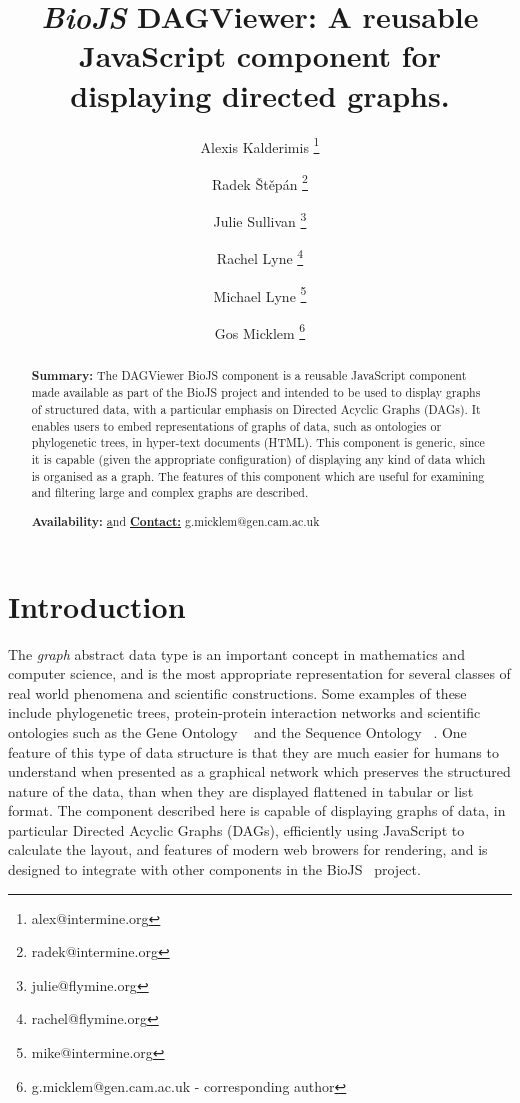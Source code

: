 \documentclass[10pt,a4paper,twocolumn]{article}
\begin{document}
\title{\textit{BioJS} DAGViewer:
  A reusable JavaScript component for displaying directed graphs.
}

\author[1]{Alexis Kalderimis \thanks{alex@intermine.org}}
\author[1]{Radek Štěpán \thanks{radek@intermine.org}}
\author[1]{Julie Sullivan \thanks{julie@flymine.org}}
\author[1]{Rachel Lyne \thanks{rachel@flymine.org}}
\author[1]{Michael Lyne \thanks{mike@intermine.org}}
\author[1]{Gos Micklem \thanks{g.micklem@gen.cam.ac.uk - corresponding author}}

\maketitle
\thispagestyle{fancy}


\begin{abstract}

\textbf{Summary:}
The DAGViewer BioJS component is a reusable JavaScript component made available
as part of the BioJS project and intended to be used to display graphs of
structured data, with a particular emphasis on Directed Acyclic Graphs (DAGs).
It enables users to embed representations of graphs of data, such as ontologies
or phylogenetic trees, in hyper-text documents (HTML).  This component is
generic, since it is capable (given the appropriate configuration) of displaying
any kind of data which is organised as a graph.  The features of this component
which are useful for examining and filtering large and complex graphs are
described.

\textbf{Availability:}
\href{http://github.com/alexkalderimis/dag-viewer-biojs} and
\href{http://github.com/biojs/biojs}

\textbf{Contact:} g.micklem@gen.cam.ac.uk

\end{abstract}
\clearpage

\section*{Introduction}

The \emph{graph} abstract data type is an important concept in mathematics and
computer science, and is the most appropriate representation for several classes
of real world phenomena and scientific constructions. Some examples of these
include phylogenetic trees, protein-protein interaction networks and scientific
ontologies such as the Gene Ontology ~\cite{GO} and the Sequence Ontology
~\cite{SO}. One feature of this type of data structure is that they are much
easier for humans to understand when presented as a graphical network which
preserves the structured nature of the data, than when they are displayed
flattened in tabular or list format. The component described here is capable of
displaying graphs of data, in particular Directed Acyclic Graphs (DAGs),
efficiently using JavaScript to calculate the layout, and features of modern
web browers for rendering, and is designed to integrate with other components in
the BioJS~\cite{biojs} project.
\end{document}
